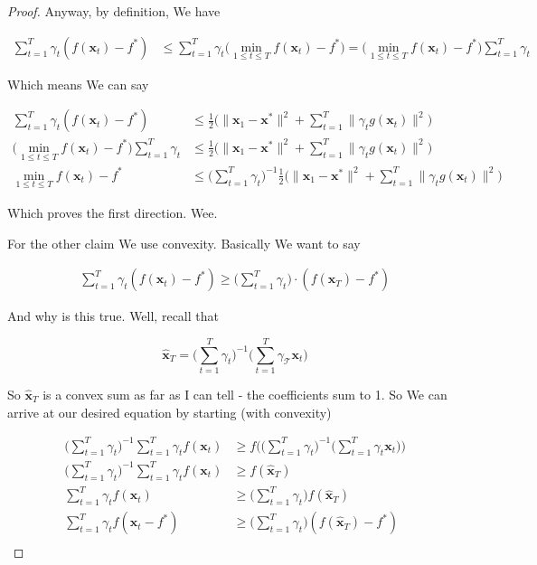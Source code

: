 \documentclass{article}
\begin{document}
\begin{proof}
			Anyway, by definition, We have
			
			\begin{align*}
				\sum^T_{t=1} \gamma_t(f(\mathbf{x}_t) - f^*)  &\le \sum^T_{t=1} \gamma_t \big(\min_{1\le t \le T} f(\mathbf{x}_t)-f^* \big) = \big(\min_{1\le t \le T} f(\mathbf{x}_t)-f^* \big) \sum^T_{t=1} \gamma_t 
			\end{align*}
			
			Which means We can say
			
			\begin{align*}
				\sum^T_{t=1} \gamma_t(f(\mathbf{x}_t) - f^*)  &\le \frac{1}{2}\big( \| \mathbf{x}_1 - \mathbf{x}^* \|^2  +  \sum^T_{t=1}  \|\gamma_t g(\mathbf{x}_t) \|^2   \big)\\
				 \big(\min_{1\le t \le T} f(\mathbf{x}_t)-f^* \big) \sum^T_{t=1} \gamma_t  &\le \frac{1}{2}\big( \| \mathbf{x}_1 - \mathbf{x}^* \|^2  +  \sum^T_{t=1}  \|\gamma_t g(\mathbf{x}_t) \|^2   \big)\\
				 \min_{1\le t \le T} f(\mathbf{x}_t)-f^*   &\le \bigg(  \sum^T_{t=1} \gamma_t \bigg)^{-1} \frac{1}{2}\big( \| \mathbf{x}_1 - \mathbf{x}^* \|^2  +  \sum^T_{t=1}  \|\gamma_t g(\mathbf{x}_t) \|^2   \big)
			\end{align*}
			
			Which proves the first direction. Wee.
			
			For the other claim We use convexity. Basically We want to say
			
			\begin{align*}
				\sum^T_{t=1} \gamma_t(f(\mathbf{x}_t) - f^*) \ge \bigg( \sum^T_{t=1}\gamma_t \bigg)\cdot (f(\mathbf{\hat{x}}_T) - f^*)
			\end{align*}
			
			And why is this true. Well, recall that 
		
			\[\mathbf{ \hat{x}}_T  = \bigg( \sum^T_{t=1}\gamma_t \bigg)^{-1}\bigg( \sum^T_{t=1} \gamma_\mathcal{T} \mathbf{x}_t \bigg)  \]
			
			So $\mathbf{ \hat{x}}_T $ is a convex sum as far as I can tell - the coefficients sum to 1.  So We can arrive at our desired equation by starting (with convexity)
			
			\begin{align*}
				\bigg( \sum^T_{t=1} \gamma_t\bigg)^{-1}\sum^T_{t=1} \gamma_t  f(\mathbf{x}_t) &\ge f\bigg( \bigg( \sum^T_{t=1}\gamma_t \bigg)^{-1}\bigg( \sum^T_{t=1} \gamma_t \mathbf{x}_t \bigg) \bigg) \\
				\bigg( \sum^T_{t=1} \gamma_t\bigg)^{-1}\sum^T_{t=1} \gamma_t f(   \mathbf{x}_t) &\ge f(\mathbf{ \hat{x}}_T) \\
				\sum^T_{t=1} \gamma_t  f(\mathbf{x}_t) &\ge\bigg( \sum^T_{t=1} \gamma_t\bigg) f(\mathbf{ \hat{x}}_T) \\
				\sum^T_{t=1} \gamma_t  f(\mathbf{x}_t - f^*) &\ge\bigg( \sum^T_{t=1} \gamma_t\bigg) (f(\mathbf{ \hat{x}}_T) - f^*) \\
			\end{align*}
			

\end{proof}
\end{document}
